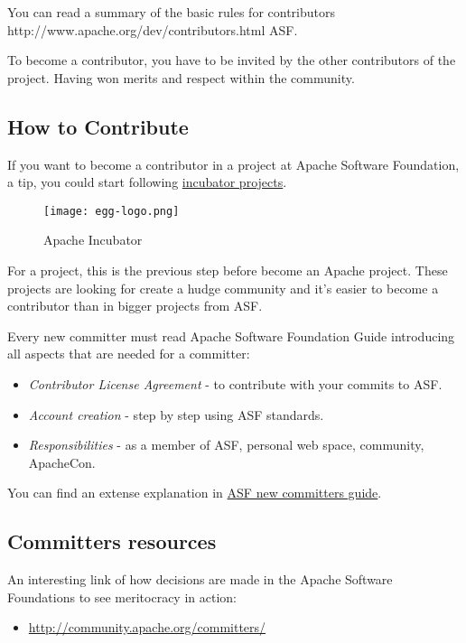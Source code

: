 \par You can read a summary of the basic rules for contributors http://www.apache.org/dev/contributors.html ASF.

\par To become a contributor, you have to be invited by the other contributors of the project. Having won merits and respect within the community.

\subsection{How to Contribute}

\par If you want to become a contributor in a project at Apache Software Foundation, a tip, you could start following \href{http://incubator.apache.org/}{incubator projects}.

\begin{figure}[htp]
    \centering
    \texttt{[image: egg-logo.png]}
    \caption{Apache Incubator}
    \label{egg-logo}
\end{figure}

\par For a project, this is the previous step before become an Apache project. These projects are looking for create a hudge community and it's easier to become a contributor than in bigger projects from ASF.

\par Every new committer must read Apache Software Foundation Guide introducing all aspects that are needed for a committer:

\begin{itemize}
	\item \textit{Contributor License Agreement} - to contribute with your commits to ASF.
	\item \textit{Account creation} - step by step using ASF standards.
	\item \textit{Responsibilities} - as a member of ASF, personal web space, community, ApacheCon.
\end{itemize} You can find an extense explanation in \href{http://www.apache.org/dev/new-committers-guide.html}{ASF new committers guide}.

\subsection{Committers resources}

\par An interesting link of how decisions are made in the Apache Software Foundations to see meritocracy in action:
\begin{itemize}
	\item \url{http://community.apache.org/committers/}
\end{itemize}

